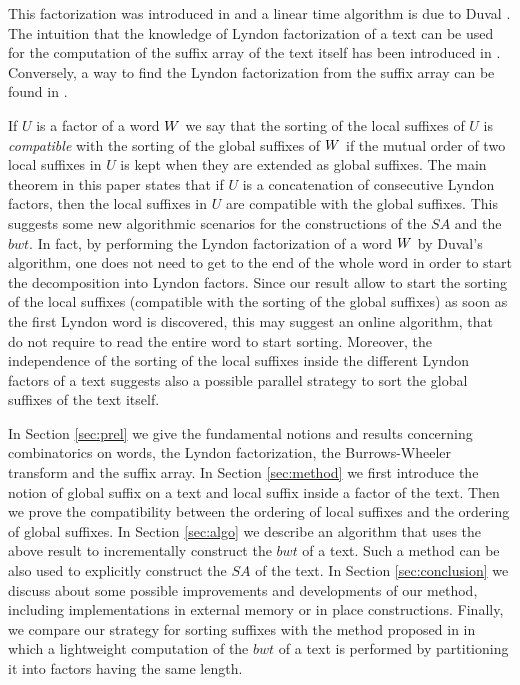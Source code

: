 \documentclass[envcountsame,runningheads]{llncs}
\begin{document}
This factorization was introduced in \cite{ChenFoxLyndon1958} and a linear time algorithm is due to Duval \cite{Duval1983}.
The intuition that the knowledge of Lyndon factorization of a text can be used for the computation of the suffix array of the text itself has been introduced in \cite{BonomoMRRSDLT2013}. Conversely, a way to find the Lyndon factorization from the suffix array can be found in \cite{HohlwegReutenauer2003}.

If $U$ is a factor of a word $W$ we say that the sorting of the local suffixes of $U$ is \emph{compatible} with the sorting of the global suffixes of $W$ if the mutual order of two local suffixes in $U$ is kept when they are extended as global suffixes. The main theorem in this paper states that if $U$ is a concatenation of consecutive Lyndon factors, then the local suffixes in $U$ are compatible with the global suffixes. This suggests some new algorithmic scenarios for the constructions of the $SA$ and the $bwt$. In fact, by performing the Lyndon factorization of a word $W$ by Duval's algorithm, one does not need to get to the end of the whole word in order to start the decomposition into Lyndon factors. Since our result allow to start the sorting of the local suffixes (compatible with the sorting of the global suffixes) as soon as the first Lyndon word is discovered, this may suggest an online algorithm, that do not require to read the entire word to start sorting. Moreover, the independence of the sorting of the local suffixes inside the different Lyndon factors of a text suggests also a possible parallel strategy to sort the global suffixes of the text itself.

In Section \ref{sec:prel} we give the fundamental notions and results concerning combinatorics on words, the Lyndon factorization, the Burrows-Wheeler transform and the suffix array. In Section \ref{sec:method} we first introduce the notion of global suffix on a text and local suffix inside a factor of the text. Then we prove the compatibility between the ordering of local suffixes and the ordering of global suffixes.
In Section \ref{sec:algo} we describe an algorithm that uses the above result to incrementally construct the $bwt$ of a text. Such a method can be also used to explicitly construct the $SA$ of the text.
In Section \ref{sec:conclusion} we discuss about some possible improvements and developments of our method, including implementations in external memory or in place constructions. Finally, we compare our strategy for sorting suffixes with the method proposed in \cite{FerraginaGagieManzini2012} in which a lightweight computation of the $bwt$ of a text is performed by partitioning it into factors having the same length.
\end{document}
